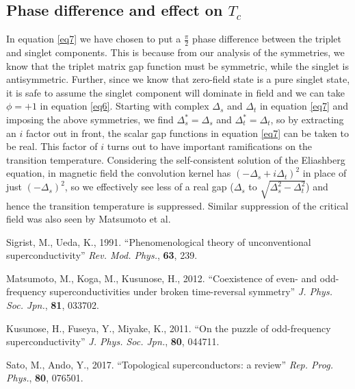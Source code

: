 \documentclass[a4paper,12pt]{article}
\begin{document}
\subsection{Phase difference and effect on $T_{c}$}

\noindent In equation \ref{eq7} we have chosen to put a $\frac{\pi}{2}$ phase difference between the triplet and singlet components. This is because from our analysis of the symmetries, we know that the triplet matrix gap function must be symmetric, while the singlet is antisymmetric. Further, since we know that zero-field state is a pure singlet state, it is safe to assume the singlet component will dominate in field and we can take $\phi=+1$ in equation \ref{eq6}. Starting with complex $\Delta_{s}$ and $\Delta_{t}$ in equation \ref{eq7} and imposing the above symmetries, we find $\Delta_{s}^{\ast}=\Delta_{s}$ and $\Delta_{t}^{\ast}=\Delta_{t}$, so by extracting an $i$ factor out in front, the scalar gap functions in equation \ref{eq7} can be taken to be real. This factor of $i$ turns out to have important ramifications on the transition temperature. Considering the self-consistent solution of the Eliashberg equation, in magnetic field the convolution kernel has $(-\Delta_{s}+i\Delta_{t})^{2}$ in place of just $(-\Delta_{s})^{2}$, so we effectively see less of a real gap ($\Delta_{s}$ to $\sqrt{\Delta_{s}^{2}-\Delta_{t}^{2}}$) and hence the transition temperature is suppressed\cite{Matsumoto}. Similar suppression of the critical field was also seen by Matsumoto et al.

\begin{thebibliography}{9}
    Sigrist, M., Ueda, K., 1991. ``Phenomenological theory of unconventional superconductivity'' \textit{Rev. Mod. Phys.}, \textbf{63}, 239.

    Matsumoto, M., Koga, M., Kusunose, H., 2012. ``Coexistence of even- and odd-frequency superconductivities under broken time-reversal symmetry'' \textit{J. Phys. Soc. Jpn.}, \textbf{81}, 033702.

    Kusunose, H., Fuseya, Y., Miyake, K., 2011. ``On the puzzle of odd-frequency superconductivity'' \textit{J. Phys. Soc. Jpn.}, \textbf{80}, 044711.

    Sato, M., Ando, Y., 2017. ``Topological superconductors: a review'' \textit{Rep. Prog. Phys.}, \textbf{80}, 076501.

\end{thebibliography}
\end{document}
